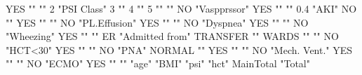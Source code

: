 \documentclass{article}\usepackage[]{graphicx}\usepackage[]{color}
\begin{document}
YES                                 ""             
                                    ""             
2                                   "PSI Class"    
3                                   ""             
4                                   ""             
5                                   ""             
                                    ""             
NO                                  "Vaspprssor"   
YES                                 ""             
                                    ""             
0.4                                 "AKI"          
NO                                  ""             
YES                                 ""             
                                    ""             
NO                                  "PL.Effusion"  
YES                                 ""             
                                    ""             
NO                                  "Dyspnea"      
YES                                 ""             
                                    ""             
NO                                  "Wheezing"     
YES                                 ""             
                                    ""             
ER                                  "Admitted from"
TRANSFER                            ""             
WARDS                               ""             
                                    ""             
NO                                  "HCT<30"       
YES                                 ""             
                                    ""             
NO                                  "PNA"          
NORMAL                              ""             
YES                                 ""             
                                    ""             
NO                                  "Mech. Vent."  
YES                                 ""             
                                    ""             
NO                                  "ECMO"         
YES                                 ""             
                                    ""             
                                    "age"          
                                    "BMI"          
                                    "psi"          
                                    "hct"          
MainTotal                           "Total"        
                                                                         
\end{document}
